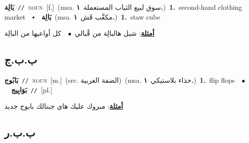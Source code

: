 \documentclass[10pt,a4paper,twoside]{article} %
\begin{document}
\begin{multicols}{2}
{\setlength\topsep{0pt}\textbf{\foreignlanguage{arabic}{بَالِة}}\ {\color{gray}\texttt{//}\color{black}}\ \textsc{noun}\ [f.]\ \color{gray}(msa. \foreignlanguage{arabic}{سوق لبيع الثياب المستعملة}~\foreignlanguage{arabic}{\textbf{١.}})\color{black}\ \textbf{1.}~second-hand clothing market\ \ $\smblkdiamond$\ \ \setlength\topsep{0pt}\textbf{\foreignlanguage{arabic}{بَالِة}}\ \color{gray}(msa. \foreignlanguage{arabic}{مكعَّب قَش}~\foreignlanguage{arabic}{\textbf{١.}})\color{black}\ \textbf{1.}~staw cube\  \begin{flushright}\color{gray}\foreignlanguage{arabic}{\textbf{\underline{\foreignlanguage{arabic}{أمثلة}}}: شيل هالبالِة من قْبالي\ $\bullet$\ \  كل أواعيها من البالِة}\end{flushright}\color{black}} \vspace{2mm}

\vspace{-3mm}
\subsection*{\color{blue}\foreignlanguage{arabic}{ب.ب.ج}\color{blue}{ (ntws)}} 

{\setlength\topsep{0pt}\textbf{\foreignlanguage{arabic}{بَابُوج}}\ {\color{gray}\texttt{//}\color{black}}\ \textsc{noun}\ [m.]\ (src. \color{gray}\foreignlanguage{arabic}{الضفة الغربية}\color{black})\ \color{gray}(msa. \foreignlanguage{arabic}{حذاء بلاستيكي}~\foreignlanguage{arabic}{\textbf{١.}})\color{black}\ \textbf{1.}~flip flops\ \ $\bullet$\ \ \setlength\topsep{0pt}\textbf{\foreignlanguage{arabic}{بَوَابِيج}}\ {\color{gray}\texttt{//}\color{black}}\ [pl.]\  \begin{flushright}\color{gray}\foreignlanguage{arabic}{\textbf{\underline{\foreignlanguage{arabic}{أمثلة}}}: مبروك عليك هاي جبنالك بابوج جديد}\end{flushright}\color{black}} \vspace{2mm}

\vspace{-3mm}
\subsection*{\color{blue}\foreignlanguage{arabic}{ب.ب.ر}\color{blue}{}} 


\end{multicols}
\end{document}
